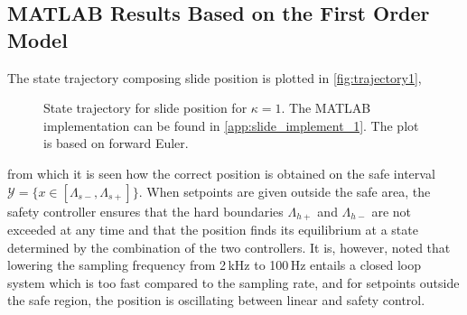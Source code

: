 \subsection{MATLAB Results Based on the First Order Model}\label{subsec:matlab-results-1order}
\vspace{-1mm}
The state trajectory composing slide position is plotted in \autoref{fig:trajectory1},
\begin{figure}[htbp]
\hspace*{-5mm}\vspace*{-1mm}
%
%
\caption{State trajectory for slide position for $\kappa=1$. The MATLAB implementation can be found in \autoref{app:slide_implement_1}. The plot is based on forward Euler.}
\label{fig:trajectory1}
\end{figure}
%
%
from which it is seen how the correct position is obtained on the safe interval $\mathcal{Y}=\{x\in[\Lambda_{s-},\Lambda_{s+}]\}$. When setpoints are given outside the safe area, the safety controller ensures that the hard boundaries $\Lambda_{h+}$ and $\Lambda_{h-}$ are not exceeded at any time and that the position finds its equilibrium at a state determined by the  combination of the two controllers. It is, however, noted that lowering the sampling frequency from 2\,kHz to 100\,Hz entails a closed loop system which is too fast compared to the sampling rate, and for setpoints outside the safe region, the position is oscillating between linear and safety control.

